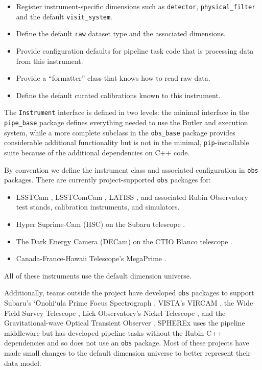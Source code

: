 \begin{itemize}
\item Register instrument-specific dimensions such as \texttt{detector}, \texttt{physical\_filter} and the default \texttt{visit\_system}.
\item Define the default \texttt{raw} dataset type and the associated dimensions.
\item Provide configuration defaults for pipeline task code that is processing data from this instrument.
\item Provide a ``formatter'' class that knows how to read raw data.
\item Define the default curated calibrations known to this instrument.
\end{itemize}

The \texttt{Instrument} interface is defined in two levels: the minimal interface in the \texttt{pipe\_base} package defines everything needed to use the Butler and execution system, while a more complete subclass in the \texttt{obs\_base} package provides considerable additional functionality but is not in the minimal, \texttt{pip}-installable suite because of the additional dependencies on C++ code.

By convention we define the instrument class and associated configuration in \texttt{obs} packages.
There are currently project-supported \texttt{obs} packages for:

\begin{itemize}
\item LSSTCam \citep{10.71929/rubin/2571927,2024SPIE13096E..1SR,2010SPIE.7735E..0JK}, LSSTComCam \citep{10.71929/rubin/2561361}, LATISS \citep{10.71929/rubin/2571930,2020SPIE11452E..0UI}, and associated Rubin Observatory test stands, calibration instruments, and simulators.
\item Hyper Suprime-Cam (HSC) on the Subaru telescope \citep{2018PASJ...70S...1M}.
\item The Dark Energy Camera (DECam) on the CTIO Blanco telescope \citep{2015AJ....150..150F,2008SPIE.7014E..0ED}.
\item Canada-France-Hawaii Telescope's MegaPrime \citep{2003SPIE.4841...72B}.
\end{itemize}

All of these instruments use the default dimension universe.

Additionally, teams outside the project have developed \texttt{obs} packages to support Subaru's `{\={O}}nohi`ula Prime Focus Spectrograph \citep{2026SPIE14149E..0CA}, VISTA's VIRCAM \citep{2015A&A...575A..25S},
the Wide Field Survey Telescope \citep[WFST;][]{2025arXiv250115018C}, Lick Observatory's Nickel Telescope \citep{2026AAS...24822403G}, and the Gravitational-wave Optical Transient Observer \citep[GOTO;][]{2021PASA...38....4M}.
SPHEREx \citep{2026ApJS..285...67A} uses the pipeline middleware but has developed pipeline tasks without the Rubin C++ dependencies and so does not use an \texttt{obs} package.
Most of these projects have made small changes to the default dimension universe to better represent their data model.

